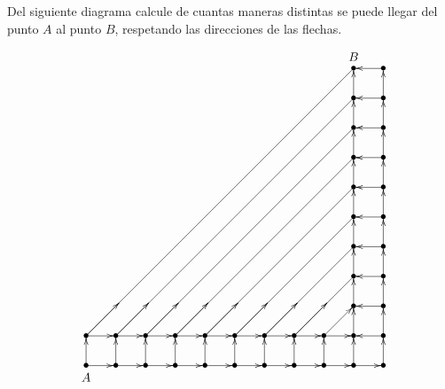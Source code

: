 \begin{Problema}{4}
  Del siguiente diagrama calcule de cuantas maneras distintas se puede
  llegar del punto $A$ al punto $B$, respetando las direcciones de las
  flechas.
\[
\SelectTips{xy}{12}
\newdir{|>}{!/4.5pt/@{>}*:(1,-.2)@^{}*:(1,+.2)@_{}}
\entrymodifiers={-<5pt>}
\xymatrix{
 & & & & & &   &       &       &  \bullet   &\bullet\ar@{-|>}[l]_>*+{B}     \\ 
 & & & & & &   &       &       & \bullet\ar@{-|>}[u] &\bullet\ar@{-|>}[l]\ar@{-|>}[u]\\
 & & & & & &   &       &       &  \bullet\ar@{-|>}[u] &\bullet\ar@{-|>}[l]\ar@{-|>}[u]\\
 & & & & & &   &       &       & \bullet \ar@{-|>}[u] &\bullet\ar@{-|>}[l]\ar@{-|>}[u] \\
 & & & & & &   &       &       & \bullet\ar@{-|>}[u] &\bullet\ar@{-|>}[l]\ar@{-|>}[u] \\
 & & & & & &   &       &       & \bullet\ar@{-|>}[u]  &\bullet\ar@{-|>}[l]\ar@{-|>}[u]   \\
 & & & & & &   &       &       & \bullet\ar@{-|>}[u]  &\bullet\ar@{-|>}[l]\ar@{-|>}[u]   \\
 & & & & & &   &      &        & \bullet \ar@{-|>}[u] &\bullet\ar@{-|>}[l]\ar@{-|>}[u]   \\
 & & & & & &   &       &       & \bullet \ar@{-|>}[u] &\bullet\ar@{-|>}[l]\ar@{-|>}[u]   \\
 \bullet\ar@{-|>}[r]\ar@{-}[uuuuuuuuurrrrrrrrr]\ar@{->}[ur]&
 \bullet\ar@{-|>}[r]\ar@{-}[uuuuuuuurrrrrrrr]\ar@{->}[ur]&
 \bullet\ar@{-|>}[r]\ar@{-}[uuuuuuurrrrrrr]\ar@{->}[ur]&
 \bullet\ar@{-|>}[r]\ar@{-}[uuuuuurrrrrr]\ar@{->}[ur]&
 \bullet\ar@{-|>}[r]\ar@{-}[uuuuurrrrr]\ar@{->}[ur]&
 \bullet\ar@{-|>}[r]\ar@{-}[uuuurrrr]\ar@{->}[ur]&
 \bullet\ar@{-|>}[r]\ar@{-}[uuurrr]\ar@{->}[ur]&
 \bullet\ar@{-|>}[r]\ar@{-}[uurr]\ar@{->}[ur]&
 \bullet\ar@{-|>}[r]\ar@{-|>}[ur]&
 \bullet\ar@{-|>}[u]& 
 \bullet \ar@{-|>}[l]\ar@{-|>}[u] \\
\bullet\ar@{-|>}[r]_<*+{A}\ar@{-|>}[u] & \bullet\ar@{-|>}[r]\ar@{-|>}[u]& \bullet\ar@{-|>}[r]\ar@{-|>}[u]& \bullet\ar@{-|>}[r]\ar@{-|>}[u] & \bullet\ar@{-|>}[r]\ar@{-|>}[u]& \bullet \ar@{-|>}[r]\ar@{-|>}[u] & \bullet  \ar@{-|>}[r]\ar@{-|>}[u] &\bullet \ar@{-|>}[r]\ar@{-|>}[u]&\bullet\ar@{-|>}[u]\ar@{-|>}[r] &\bullet\ar@{-|>}[r]\ar@{-|>}[u] & \bullet  \ar@{-|>}[u] \\
 }
\]
\end{Problema}

\begin{Solucion}
  
\end{Solucion}

